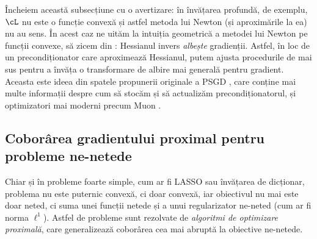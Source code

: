 \documentclass[../../book-main_ro.tex]{subfiles}
\begin{document}
Încheiem această subsecțiune cu o avertizare: în învățarea profundă, de exemplu, \(\cL\) nu este o funcție convexă și astfel metoda lui Newton (și aproximările la ea) nu au sens. În acest caz ne uităm la intuiția geometrică a metodei lui Newton pe funcții convexe, să zicem din : Hessianul invers \textit{albește} gradienții. Astfel, în loc de un precondiționator care aproximează Hessianul, putem ajusta procedurile de mai sus pentru a învăța o transformare de albire mai generală pentru gradient. Aceasta este ideea din spatele propunerii originale a PSGD \cite{li2017preconditioned}, care conține mai multe informații despre cum să stocăm și să actualizăm precondiționatorul, și optimizatori mai moderni precum Muon \cite{liu2025muon}.


\subsection{Coborârea gradientului proximal pentru probleme ne-netede}\label{subsec:pgd}

Chiar și în probleme foarte simple, cum ar fi LASSO sau învățarea de dicționar, problema nu este puternic convexă, ci doar convexă, iar obiectivul nu mai este doar neted, ci suma unei funcții netede și a unui regularizator ne-neted (cum ar fi norma \(\ell^{1}\)). Astfel de probleme sunt rezolvate de \textit{algoritmi de optimizare proximală}, care generalizează coborârea cea mai abruptă la obiective ne-netede.
\end{document}
